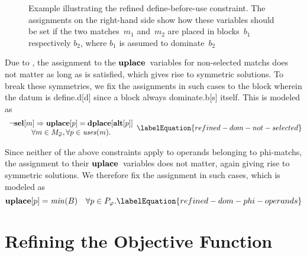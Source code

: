 \begin{figure}
  \centering%

  \caption[Example illustrating the refined define-before-use constraint]%
          {%
            Example illustrating the refined define-before-use constraint.
            The assignments on the right-hand side show how these
            variables should be set if the two matches~$m_1$ and~$m_2$ are
            placed in blocks~$b_1$ respectively $b_2$, where $b_1$ is assumed to
            dominate~$b_2$%
          }
\end{figure}

Due to , the assignment to the
$\mVar{uplace}$~\glspl{variable} for non-selected \glspl{match} does not matter
as long as  is satisfied, which gives rise to symmetric
\glspl{solution}.
%
To break these symmetries, we fix the assignments in such cases to the
\gls{block} wherein the \gls{datum} is \gls{define.d}[d] since a \gls{block}
always \gls{dominate.b}[s] itself.
%
This is modeled as
%
\begin{equation}
  \begin{array}{c}
    \neg\mVar{sel}[m] \mImp \mVar{uplace}[p] = \mVar{dplace}[\mVar{alt}[p]] \\
    \forall m \in \mPhiMatchCompSet,
    \forall p \in \mUses(m).
  \end{array}
  \labelEquation{refined-dom-not-selected}
\end{equation}

Since neither of the above \glspl{constraint} apply to \glspl{operand} belonging
to \glspl{phi-match}, the assignment to their $\mVar{uplace}$~\glspl{variable}
does not matter, again giving rise to symmetric \glspl{solution}.
%
We therefore fix the assignment in such cases, which is modeled as
%
\begin{equation}
  \mVar{uplace}[p] = \mMin(\mBlockSet)
  \mQuantSep
  \forall p \in \mPhiOperandSet.
  \labelEquation{refined-dom-phi-operands}
\end{equation}


\section{Refining the Objective Function}

